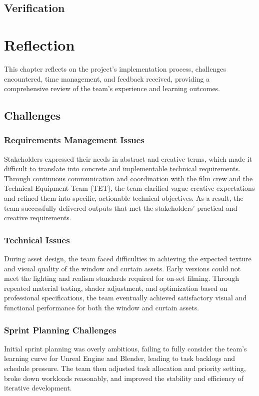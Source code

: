 \documentclass[12pt,a4paper]{report}
\begin{document}
\section{Verification}


\chapter{Reflection}
This chapter reflects on the project’s implementation process, challenges encountered, time management, and feedback received, providing a comprehensive review of the team’s experience and learning outcomes.

\section{Challenges}

\subsection{Requirements Management Issues}
Stakeholders expressed their needs in abstract and creative terms, which made it difficult to translate into concrete and implementable technical requirements. Through continuous communication and coordination with the film crew and the Technical Equipment Team (TET), the team clarified vague creative expectations and refined them into specific, actionable technical objectives. As a result, the team successfully delivered outputs that met the stakeholders’ practical and creative requirements.

\subsection{Technical Issues}
During asset design, the team faced difficulties in achieving the expected texture and visual quality of the window and curtain assets. Early versions could not meet the lighting and realism standards required for on‑set filming. Through repeated material testing, shader adjustment, and optimization based on professional specifications, the team eventually achieved satisfactory visual and functional performance for both the window and curtain assets.

\subsection{Sprint Planning Challenges}
Initial sprint planning was overly ambitious, failing to fully consider the team’s learning curve for Unreal Engine and Blender, leading to task backlogs and schedule pressure. The team then adjusted task allocation and priority setting, broke down workloads reasonably, and improved the stability and efficiency of iterative development.
\end{document}
